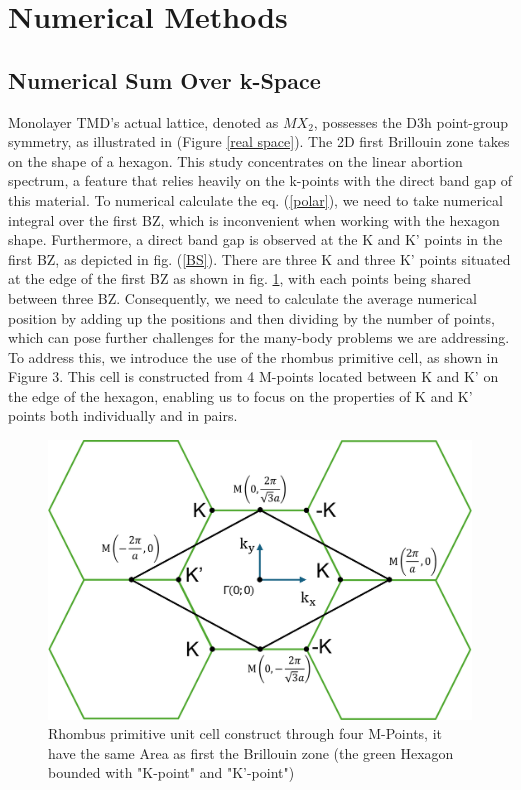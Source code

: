 \documentclass[12pt,english,a4paper]{article}
\begin{document}
\section{Numerical Methods}
\subsection{Numerical Sum Over k-Space}
\quad Monolayer TMD's actual lattice, denoted as $MX_2$, possesses the D3h point-group symmetry, as illustrated in (Figure \ref{real space}). The 2D first Brillouin zone takes on the shape of a hexagon. This study concentrates on the linear abortion spectrum, a feature that relies heavily on the k-points with the direct band gap of this material. To numerical calculate the eq. (\ref{polar}), we need to take numerical integral over the first BZ, which is inconvenient when working with the hexagon shape. Furthermore, a direct band gap is observed at the K and K' points in the first BZ, as depicted in fig. (\ref{BS}). There are three K and three K' points situated at the edge of the first BZ as shown in fig. \ref{Rhombus}, with each points being shared between three BZ. Consequently, we need to calculate the average numerical position by adding up the positions and then dividing by the number of points, which can pose further challenges for the many-body problems we are addressing.\\\null
\quad To address this, we introduce the use of the rhombus primitive cell, as shown in Figure 3. This cell is constructed from 4 M-points located between K and K' on the edge of the hexagon, enabling us to focus on the properties of K and K' points both individually and in pairs.
\begin{figure}
	\begin{center}
\includegraphics[width= 0.75\linewidth]{Images/Rhombus.pdf}
\caption[Rhombus primitive unit cell in compare with hexagon primitive unit cell (the first Brillouin zone)]{Rhombus primitive unit cell construct through four M-Points, it have the same Area as first the Brillouin zone (the green Hexagon bounded with "K-point" and "K'-point")}
\label{Rhombus}
	\end{center}
\end{figure}\\\null
\end{document}
